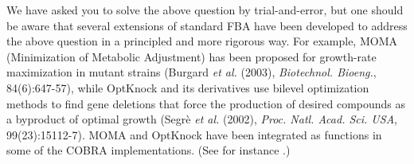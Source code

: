\noindent We have asked you to solve the above question by trial-and-error, but one should be aware that several extensions of standard FBA have been developed to address the above question in a principled and more rigorous way. For example, MOMA (Minimization of Metabolic Adjustment) has been proposed for growth-rate maximization in mutant strains (Burgard \textit{et al.} (2003), \textit{Biotechnol. Bioeng.}, 84(6):647-57), while OptKnock and its derivatives use bilevel optimization methods to find gene deletions that force the production of desired compounds as a byproduct of optimal growth (Segr\`{e} \textit{et al.} (2002), \textit{Proc. Natl. Acad. Sci. USA}, 99(23):15112-7). MOMA and OptKnock have been integrated as functions in some of the COBRA implementations. (See for instance .)